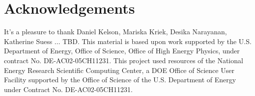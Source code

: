 \documentclass[12pt, letterpaper, preprint, comicneue]{aastex63}
\newcommand{\ch}[1]{{\color{orange}#1}}
\begin{document}


 





\section*{Acknowledgements}
It's a pleasure to thank
    Daniel Kelson, 
    Mariska Kriek, 
    Desika Narayanan,
    Katherine Suess 
    ...
\ch{TBD}.
This material is based upon work supported by the U.S. Department of Energy,
Office of Science, Office of High Energy Physics, under contract No.
DE-AC02-05CH11231.  This project used resources of the National Energy Research
Scientific Computing Center, a DOE Office of Science User Facility supported by
the Office of Science of the U.S.  Department of Energy under Contract No.
DE-AC02-05CH11231. 

\appendix
%
% 
 


 
\end{document}
